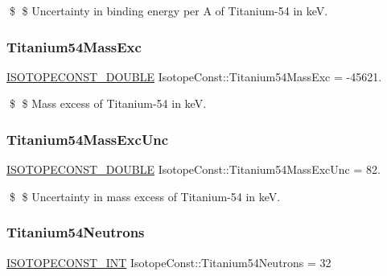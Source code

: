 \$ \$ Uncertainty in binding energy per A of Titanium-\/54 in keV. \mbox{\label{group___isotope_const-_titanium-_ti54_ga7a5df60fde77554442562b451e774a01}} 
\subsubsection{\texorpdfstring{Titanium54\+Mass\+Exc}{Titanium54MassExc}}
{\footnotesize\ttfamily \mbox{\hyperlink{group___isotope_const-_macros_ga8f45a7272ce02c0b4c65c44636ed719a}{I\+S\+O\+T\+O\+P\+E\+C\+O\+N\+S\+T\+\_\+\+D\+O\+U\+B\+LE}} Isotope\+Const\+::\+Titanium54\+Mass\+Exc = -\/45621.}

\$ \$ Mass excess of Titanium-\/54 in keV. \mbox{\label{group___isotope_const-_titanium-_ti54_ga70eac362df4bbcb02f494c4f06d15a06}} 
\subsubsection{\texorpdfstring{Titanium54\+Mass\+Exc\+Unc}{Titanium54MassExcUnc}}
{\footnotesize\ttfamily \mbox{\hyperlink{group___isotope_const-_macros_ga8f45a7272ce02c0b4c65c44636ed719a}{I\+S\+O\+T\+O\+P\+E\+C\+O\+N\+S\+T\+\_\+\+D\+O\+U\+B\+LE}} Isotope\+Const\+::\+Titanium54\+Mass\+Exc\+Unc = 82.}

\$ \$ Uncertainty in mass excess of Titanium-\/54 in keV. \mbox{\label{group___isotope_const-_titanium-_ti54_ga6494a16e1c671c51a3e7f63e13386020}} 
\subsubsection{\texorpdfstring{Titanium54\+Neutrons}{Titanium54Neutrons}}
{\footnotesize\ttfamily \mbox{\hyperlink{group___isotope_const-_macros_ga5f18360b3e99483a35c32d789e62621c}{I\+S\+O\+T\+O\+P\+E\+C\+O\+N\+S\+T\+\_\+\+I\+NT}} Isotope\+Const\+::\+Titanium54\+Neutrons = 32}


